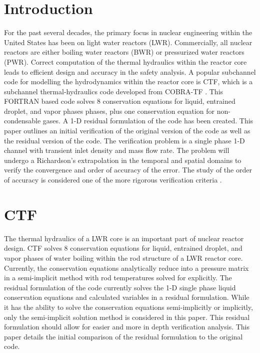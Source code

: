 \documentclass{mc2015}
\begin{document}
\clearpage

%

\section{Introduction}

For the past several decades, the primary focus in nuclear engineering within
the United States has been on light water reactors (LWR). Commercially,
all nuclear reactors are either boiling water reactors (BWR) or pressurized
water reactors (PWR). Correct computation of the thermal hydraulics within the
reactor core leads to efficient design and accuracy in the safety analysis. A
popular subchannel code for modelling the hydrodynamics within the reactor core
is CTF, which is a subchannel thermal-hydraulics code developed from
COBRA-TF \cite{CTF_Theory}. This FORTRAN based code solves 8 conservation
equations for liquid, entrained droplet, and vapor phases phases, plus one
conservation equation for non-condensable gases. A 1-D residual formulation of
the code has been created. This paper outlines an initial verification of the
original version of the code as well as the residual version of the code. The
verification problem is a single phase 1-D channel with transient inlet density
and mass flow rate. The problem will undergo a Richardson's extrapolation in the
temporal and spatial domains to verify the convergence and order of accuracy of
the error. The study of the order of accuracy is considered one of the more
rigorous verification criteria \cite{VV_review}.

\section{CTF}

The thermal hydraulics of a LWR core is an important part of nuclear
reactor design. CTF solves 8 conservation equations for liquid,
entrained droplet, and vapor phases of water boiling within the rod structure
of a LWR reactor core. Currently, the conservation
equations analytically reduce into a pressure matrix in a semi-implicit
method with rod temperatures solved for explicitly. The residual formulation of
the code currently solves the 1-D single phase liquid conservation equations and
calculated variables in a residual formulation. While it has the ability to
solve the conservation equations semi-implicitly or implicitly, only the
semi-implicit solution method is considered in this paper. This residual
formulation should allow for easier and more in depth verification  analysis.
This paper details the initial comparison of the residual  formulation to the original code.
\end{document}
